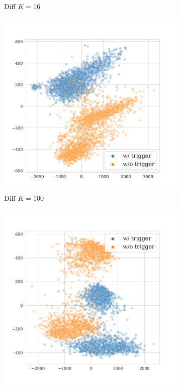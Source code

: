 \begin{figure}[!ht]
\begin{subfigure}{.33\textwidth}
  \caption{Diff $K = 16$}
  \label{fig:enron_spam_diff_k16_embed}
\end{subfigure}%
\begin{subfigure}{.33\textwidth}
  \centering
  \includegraphics[width=\linewidth]{figures/evaluation_media/enron-spam-roberta-large-visual-backdoor-diff-k100-seed42-poison-cf-1734.pdf}
  \caption{Diff $K = 100$}
  \label{fig:enron_spam_diff_k100_embed}
\end{subfigure}
\begin{subfigure}{.33\textwidth}
  \centering
  \includegraphics[width=\linewidth]{figures/evaluation_media/enron-spam-roberta-large-visual-backdoor-diff-k1000-seed42-poison-cf-1745.pdf}

\end{subfigure}
\end{figure}
